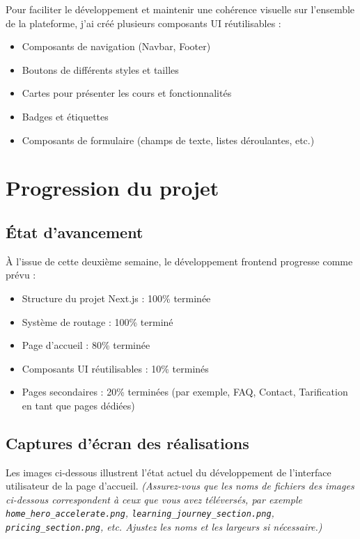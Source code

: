 \documentclass[12pt, a4paper]{article}
\begin{document}
Pour faciliter le développement et maintenir une cohérence visuelle sur l'ensemble de la plateforme, j'ai créé plusieurs composants UI réutilisables :

\begin{itemize}
  \item Composants de navigation (Navbar, Footer)
  \item Boutons de différents styles et tailles
  \item Cartes pour présenter les cours et fonctionnalités
  \item Badges et étiquettes
  \item Composants de formulaire (champs de texte, listes déroulantes, etc.)
\end{itemize}

\section{Progression du projet}

\subsection{État d'avancement}

À l'issue de cette deuxième semaine, le développement frontend progresse comme prévu :

\begin{itemize}
  \item Structure du projet Next.js : 100\% terminée
  \item Système de routage : 100\% terminé
  \item Page d'accueil : 80\% terminée
  \item Composants UI réutilisables : 10\% terminés
  \item Pages secondaires : 20\% terminées (par exemple, FAQ, Contact, Tarification en tant que pages dédiées)
\end{itemize}

\subsection{Captures d'écran des réalisations}

Les images ci-dessous illustrent l'état actuel du développement de l'interface utilisateur de la page d'accueil.
\textit{(Assurez-vous que les noms de fichiers des images ci-dessous correspondent à ceux que vous avez téléversés, par exemple \texttt{home\_hero\_accelerate.png}, \texttt{learning\_journey\_section.png}, \texttt{pricing\_section.png}, etc. Ajustez les noms et les largeurs si nécessaire.)}
\end{document}
